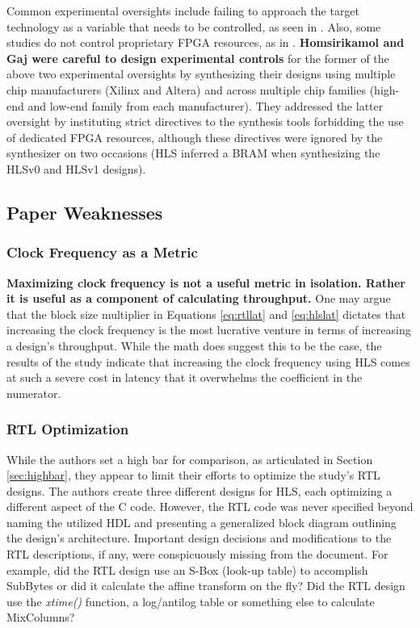 \documentclass[12pt,journal,compsoc,onecolumn]{IEEEtran}
\begin{document}
Common experimental oversights include failing to approach the target technology as a variable that needs to be controlled, as seen in \cite{skalicky}. Also, some studies do not control proprietary FPGA resources, as in \cite{10}. \textbf{Homsirikamol and Gaj were careful to design experimental controls} for the former of the above two experimental oversights by synthesizing their designs using multiple chip manufacturers (Xilinx and Altera) and across multiple chip families (high-end and low-end family from each manufacturer). They addressed the latter oversight by instituting strict directives to the synthesis tools forbidding the use of dedicated FPGA resources, although these directives were ignored by the synthesizer on two occasions (HLS inferred a BRAM when synthesizing the HLSv0 and HLSv1 designs).

\subsection{Paper Weaknesses}\label{sec:weaknesses}
\subsubsection{Clock Frequency as a Metric}
\textbf{Maximizing clock frequency is not a useful metric in isolation. Rather it is useful as a component of calculating throughput.} One may argue that the block size multiplier in Equations \ref{eq:rtllat} and \ref{eq:hlslat} dictates that increasing the clock frequency is the most lucrative venture in terms of increasing a design's throughput. While the math does suggest this to be the case, the results of the study indicate that increasing the clock frequency using HLS comes at such a severe cost in latency that it overwhelms the coefficient in the numerator.

\subsubsection{RTL Optimization}\label{sec:rtlop}
While the authors set a high bar for comparison, as articulated in Section \ref{sec:highbar}, they appear to limit their efforts to optimize the study's RTL designs. The authors create three different designs for HLS, each optimizing a different aspect of the C code. However, the RTL code was never specified beyond naming the utilized HDL and presenting a generalized block diagram outlining the design's architecture. Important design decisions and modifications to the RTL descriptions, if any, were conspicuously missing from the document. For example, did the RTL design use an S-Box (look-up table) to accomplish SubBytes or did it calculate the affine transform on the fly? Did the RTL design use the \emph{xtime()} function, a log/antilog table or something else to calculate MixColumns? 
\end{document}
